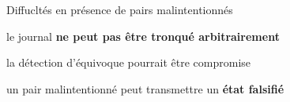 \begin{frame}{Diffucltés en présence de pairs malintentionnés}
\begin{minipage}[c][.55\textheight][t]{\textwidth}
    \end{minipage}
    \begin{minipage}{\textwidth}
        \begin{compactitemize}
            \item le journal \textbf{ne peut pas être tronqué arbitrairement}
            \begin{compactitemize}
                \item la détection d'équivoque pourrait être compromise
            \end{compactitemize}
            \item un pair malintentionné peut transmettre un \textbf{état falsifié}
        \end{compactitemize}
    \end{minipage}
\end{frame}


